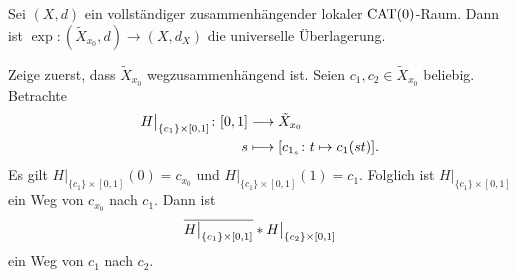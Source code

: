 \begin{satz}
\label{satz:2.33}
	Sei $(X,d)$ ein vollständiger zusammenhängender lokaler $\operatorname{CAT(0)}$-Raum. 
	Dann ist $\exp\colon (\tilde{X}_{x_0},d) \rightarrow (X,d_X)$ die universelle Überlagerung.
\end{satz}

\begin{beweis}
	Zeige zuerst, dass $\tilde{X}_{x_0}$ wegzusammenhängend ist.
	Seien $c_1,c_2 \in \tilde{X}_{x_0}$ beliebig.
	Betrachte
	\begin{align*}
		H \big|_{\{c_1\} \times [0,1]} \colon [0,1] &\longrightarrow \tilde{X}_{x_0} \\
		s &\longmapsto \benbrace*{c_{1_s} \colon t \mapsto c_1(st)}.
	\end{align*}
	Es gilt $H \big|_{\{c_1\} \times [0,1]}(0) = c_{x_0}$ und $H \big|_{\{c_1\} \times [0,1]}(1) = c_1$.
	Folglich ist $H\big|_{\{c_1\} \times [0,1]}$ ein Weg von $c_{x_0}$ nach $c_1$.
	Dann ist
	\[
		\overline{H \big|_{\{c_1\} \times [0,1]}} * H \big|_{\{c_2\} \times [0,1]}
	\] 
	ein Weg von $c_1$ nach $c_2$.
	

\end{beweis}
